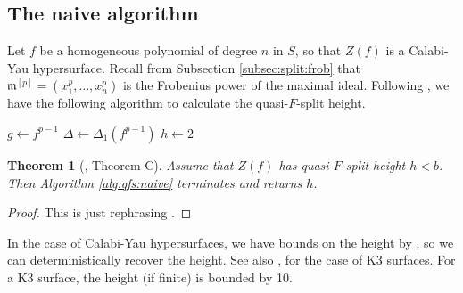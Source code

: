 \documentclass[a4paper]{article}
\newtheorem{thm}{Theorem}[section]
\theoremstyle{definition}
\theoremstyle{remark}
\begin{document}
\subsection{The naive algorithm}

Let \(f\) be a homogeneous polynomial of degree \(n\) 
in \(S\), 
so that \(Z(f)\) is a Calabi-Yau hypersurface.
Recall from Subsection \ref{subsec:split:frob} that
\(\mathfrak{m}^{[p]} = (x_{1}^{p}, \ldots, x_{n}^{p})\)
is the Frobenius power of the maximal ideal.
Following \cite{kty-2022-fedder}, we have the following
algorithm to calculate the quasi-\(F\)-split height.

\begin{algorithm}[H]
\caption{quasi-\(F\)-split height: naive algorithm}
\label{alg:qfs:naive}
$g \gets f^{p - 1}$\;
$\Delta \gets \Delta_1(f^{p-1})$\;
$h \gets 2$\;
\end{algorithm}

\begin{thm}
	[\cite{kty-2022-fedder}, Theorem C]
	Assume that
	\(Z(f)\) has quasi-\(F\)-split height \(h < b\).
	Then Algorithm \ref{alg:qfs:naive} terminates
	and returns \(h\).
\end{thm}

\begin{proof}
	This is just rephrasing \cite[Theorem~C]{kty-2022-fedder}.
\end{proof}

In the case of Calabi-Yau hypersurfaces, we have bounds on the height by
\cite{van-der-geer-katsura-2003-calabi-yau},
so we can deterministically recover the height.  
See also \cite[Theorem~0.1]{artin-1974-k3-surfaces},
for the case of K3 surfaces.
For a K3 surface, the height (if finite) is bounded by 10.
\end{document}
